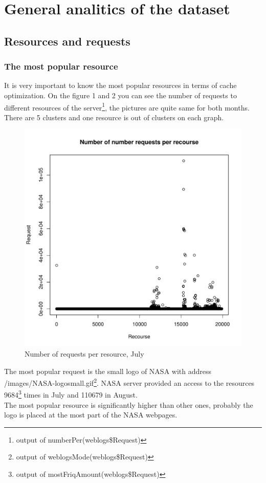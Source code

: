 \documentclass[english]{article}
\begin{document}
\section{General analitics of the dataset}
\subsection{Resources and requests}
\subsubsection{The most popular resource}
It is very important to know the most popular resources in terms of cache optimization. On the figure 1 and 2 you can see the number of requests to different resources of the server\footnote{output of numberPer(weblogs\$Request)}, the pictures are quite same for both months. There are 5 clusters and one resource is out of clusters on each graph.
\begin{figure}[H]
\centerline{\includegraphics[scale=0.95]{Weblogs/Jul/NumberOfNumberRequestsPerRecourse.pdf}}
\caption{Number of requests per resource, July}
\end{figure}
The most popular request is the small logo of NASA with address /images/NASA-logosmall.gif\footnote{output of weblogsMode(weblogs\$Request)}. NASA server provided an access to the resources 9684\footnote{output of mostFriqAmount(weblogs\$Request)} times in July and 110679 in August.\\ The most popular resource is significantly higher than other ones, probably the logo is placed at the most part of the NASA webpages.
\end{document}
